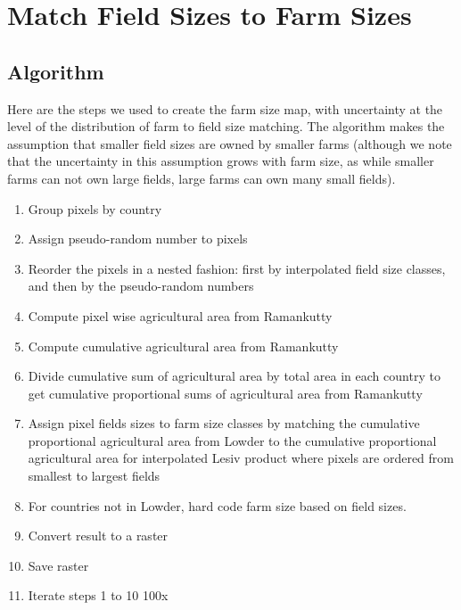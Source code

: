 \documentclass{article}
\begin{document}
\newpage
\section{Match Field Sizes to Farm Sizes}

\subsection{Algorithm}

Here are the steps we used to create the farm size map, with uncertainty at the level of the distribution of farm to field size matching. The algorithm makes the assumption that smaller field sizes are owned by smaller farms (although we note that the uncertainty in this assumption grows with farm size, as while smaller farms can not own large fields, large farms can own many small fields).

\begin{enumerate}
  \item Group pixels by country
  \item Assign pseudo-random number to pixels
  \item Reorder the pixels in a nested fashion: first by interpolated field size classes, and then by the pseudo-random numbers
  \item Compute pixel wise agricultural area from Ramankutty 
  \item Compute cumulative agricultural area from Ramankutty 
  \item Divide cumulative sum of agricultural area by total area in each country to get cumulative proportional sums of agricultural area from Ramankutty 
  \item Assign pixel fields sizes to farm size classes by matching the cumulative proportional agricultural area from Lowder to the cumulative proportional agricultural area for interpolated Lesiv product  where pixels are ordered from smallest to largest fields
  \item For countries not in Lowder, hard code farm size based on field sizes.
  \item Convert result to a raster
  \item Save raster
  \item Iterate steps 1 to 10 100x
\end{enumerate}
\end{document}
